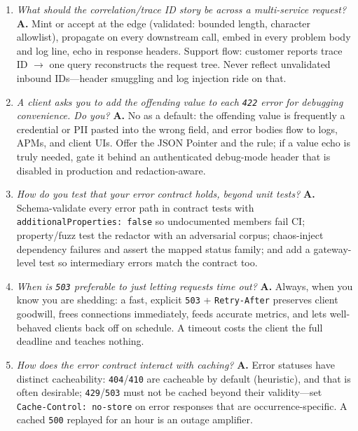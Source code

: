 \begin{enumerate}[label=\textbf{Q\arabic*.}, leftmargin=3.2em, start=18]
        database calls into Pydantic validators---models become untestable,
        and request latency becomes validation latency with no caching
        story.
  \item \emph{What should the correlation/trace ID story be across a
        multi-service request?} \textbf{A.} Mint or accept at the edge
        (validated: bounded length, character allowlist), propagate on every
        downstream call, embed in every problem body and log line, echo in
        response headers. Support flow: customer reports trace ID $\to$
        one query reconstructs the request tree. Never reflect unvalidated
        inbound IDs---header smuggling and log injection ride on that.
  \item \emph{A client asks you to add the offending \emph{value} to each
        \texttt{422} error for debugging convenience. Do you?} \textbf{A.}
        No as a default: the offending value is frequently a credential or
        PII pasted into the wrong field, and error bodies flow to logs,
        APMs, and client UIs. Offer the JSON Pointer and the rule; if a
        value echo is truly needed, gate it behind an authenticated
        debug-mode header that is disabled in production and redaction-aware.
  \item \emph{How do you test that your error contract holds, beyond unit
        tests?} \textbf{A.} Schema-validate every error path in contract
        tests with \texttt{additionalProperties: false} so undocumented
        members fail CI; property/fuzz test the redactor with an
        adversarial corpus; chaos-inject dependency failures and assert the
        mapped status family; and add a gateway-level test so intermediary
        errors match the contract too.
  \item \emph{When is \texttt{503} preferable to just letting requests time
        out?} \textbf{A.} Always, when you know you are shedding: a fast,
        explicit \texttt{503} + \texttt{Retry-After} preserves client
        goodwill, frees connections immediately, feeds accurate metrics, and
        lets well-behaved clients back off on schedule. A timeout costs the
        client the full deadline and teaches nothing.
  \item \emph{How does the error contract interact with caching?}
        \textbf{A.} Error statuses have distinct cacheability:
        \texttt{404}/\texttt{410} are cacheable by default (heuristic), and
        that is often desirable; \texttt{429}/\texttt{503} must not be
        cached beyond their validity---set \texttt{Cache-Control: no-store}
        on error responses that are occurrence-specific. A cached
        \texttt{500} replayed for an hour is an outage amplifier.
\end{enumerate}

